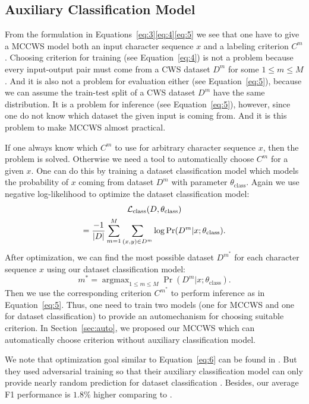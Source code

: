 \documentclass[11pt]{article}
\newcommand{\loss}{\mathcal{L}}
\newcommand{\opClass}{\operatorname{class}}
\newcommand{\thetaC}{\theta_{\opClass}}
\DeclareMathOperator*{\argmax}{\arg\max}
\DeclarePairedDelimiter{\abs}{\lvert}{\rvert}
\begin{document}
\subsection{Auxiliary Classification Model}\label{sec:class}

From the formulation in Equations~\eqref{eq:3}\eqref{eq:4}\eqref{eq:5} we see that one have to give a MCCWS model both an input character sequence \(x\) and a labeling criterion \(C^m\).
Choosing criterion for training (see Equation~\eqref{eq:4}) is not a problem because every input-output pair must come from a CWS dataset \(D^m\) for some \(1 \leq m \leq M\).
And it is also not a problem for evaluation either (see Equation~\eqref{eq:5}), because we can assume the train-test split of a CWS dataset \(D^m\) have the same distribution.
It is a problem for inference (see Equation~\eqref{eq:5}), however, since one do not know which dataset the given input is coming from.
And it is this problem to make MCCWS almost practical.

If one always know which \(C^m\) to use for arbitrary character sequence \(x\), then the problem is solved.
Otherwise we need a tool to automatically choose \(C^m\) for a given \(x\).
One can do this by training a dataset classification model which models the probability of \(x\) coming from dataset \(D^m\) with parameter \(\thetaC\).
Again we use negative log-likelihood to optimize the dataset classification model:
\begin{multline}\label{eq:6}
  \loss_{\opClass}(D, \thetaC) \\
  = \dfrac{-1}{\abs{D}} \sum_{m = 1}^M \sum_{(x, y) \in D^m} \log \Pr(D^m | x ; \thetaC).
\end{multline}
After optimization, we can find the most possible dataset \(D^{m^*}\) for each character sequence \(x\) using our dataset classification model:
\begin{equation}\label{eq:7}
  m^* = \argmax_{1 \leq m \leq M} \Pr(D^m | x ; \thetaC).
\end{equation}
Then we use the corresponding criterion \(C^{m^*}\) to perform inference as in Equation~\eqref{eq:5}.
Thus, one need to train two models (one for MCCWS and one for dataset classification) to provide an automechanism for choosing suitable criterion.
In Section~\ref{sec:auto}, we proposed our MCCWS which can automatically choose criterion without auxiliary classification model.

We note that optimization goal similar to Equation~\eqref{eq:6} can be found in \citep{chen-etal-2017-adversarial}.
But they used adversarial training so that their auxiliary classification model can only provide nearly random prediction for dataset classification \citep{goodfellow-2014-gan}.
Besides, our average F1 performance is \(1.8\%\) higher comparing to \citep{chen-etal-2017-adversarial}.
\end{document}
